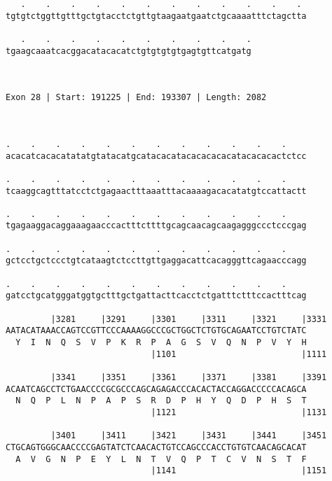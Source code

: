 \documentclass{article}
\begin{document}
\begin{Verbatim}
   .    .    .    .    .    .    .    .    .    .    .    . 
tgtgtctggttgtttgctgtacctctgttgtaagaatgaatctgcaaaatttctagctta
                                                            
   .    .    .    .    .    .    .    .    .    .
tgaagcaaatcacggacatacacatctgtgtgtgtgagtgttcatgatg
                                                 
                                                 
 
Exon 28 | Start: 191225 | End: 193307 | Length: 2082



.    .    .    .    .    .    .    .    .    .    .    .    
acacatcacacatatatgtatacatgcatacacatacacacacacatacacacactctcc
                                                            
.    .    .    .    .    .    .    .    .    .    .    .    
tcaaggcagtttatcctctgagaactttaaatttacaaaagacacatatgtccattactt
                                                            
.    .    .    .    .    .    .    .    .    .    .    .    
tgagaaggacaggaaagaacccactttcttttgcagcaacagcaagagggccctcccgag
                                                            
.    .    .    .    .    .    .    .    .    .    .    .    
gctcctgctccctgtcataagtctccttgttgaggacattcacagggttcagaacccagg
                                                            
.    .    .    .    .    .    .    .    .    .    .    .    
gatcctgcatgggatggtgctttgctgattacttcacctctgatttctttccactttcag
                                                            
         |3281     |3291     |3301     |3311     |3321     |3331
AATACATAAACCAGTCCGTTCCCAAAAGGCCCGCTGGCTCTGTGCAGAATCCTGTCTATC
  Y  I  N  Q  S  V  P  K  R  P  A  G  S  V  Q  N  P  V  Y  H
                             |1101                         |1111
  
         |3341     |3351     |3361     |3371     |3381     |3391
ACAATCAGCCTCTGAACCCCGCGCCCAGCAGAGACCCACACTACCAGGACCCCCACAGCA
  N  Q  P  L  N  P  A  P  S  R  D  P  H  Y  Q  D  P  H  S  T
                             |1121                         |1131
  
         |3401     |3411     |3421     |3431     |3441     |3451
CTGCAGTGGGCAACCCCGAGTATCTCAACACTGTCCAGCCCACCTGTGTCAACAGCACAT
  A  V  G  N  P  E  Y  L  N  T  V  Q  P  T  C  V  N  S  T  F
                             |1141                         |1151
  

\end{Verbatim}
\end{document}
